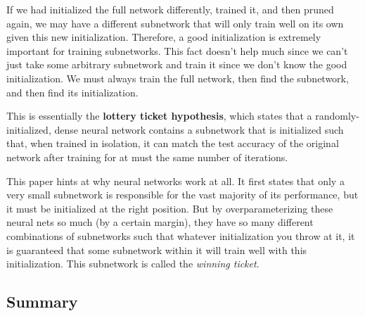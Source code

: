 \documentclass{article}
\theoremstyle{definition}
\theoremstyle{remark}
\theoremstyle{definition}
\begin{document}
If we had initialized the full network differently, trained it, and then pruned again, we may have a different subnetwork that will only train well on its own given this new initialization. Therefore, a good initialization is extremely important for training subnetworks. This fact doesn't help much since we can't just take some arbitrary subnetwork and train it since we don't know the good initialization. We must always train the full network, then find the subnetwork, and then find its initialization. 

This is essentially the \textbf{lottery ticket hypothesis}, which states that a randomly-initialized, dense neural network contains a subnetwork that is initialized such that, when trained in isolation, it can match the test accuracy of the original network after training for at must the same number of iterations. 

This paper hints at why neural networks work at all. It first states that only a very small subnetwork is responsible for the vast majority of its performance, but it must be initialized at the right position. But by overparameterizing these neural nets so much (by a certain margin), they have so many different combinations of subnetworks such that whatever initialization you throw at it, it is guaranteed that some subnetwork within it will train well with this initialization. This subnetwork is called the \textit{winning ticket}. 

\subsection{Summary}
\end{document}
